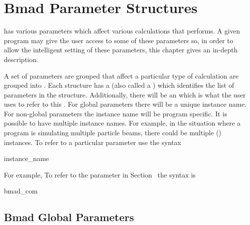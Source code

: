 \chapter{Bmad Parameter Structures}

\bmad has various parameters which affect various
calculations that \bmad performs. A given program may give the user
access to some of these parameters so, in order to allow the intelligent
setting of these parameters, this chapter gives an in-depth description.

A set of parameters are grouped that affect a particular type
of calculation are grouped into . Each structure
has a  (also called a ) which identifies
the list of parameters in the structure. 
Additionally, there will be an
 which is what the user uses to refer to this
. For global parameters there will be a unique instance name.
For non-global parameters the instance name will be program specific. 
It is possible to have multiple instance names. For example, in the situation
where a program is simulating multiple particle beams, there could be
multiple  () instances. 
To refer to a particular parameter use the syntax
\begin{example}
  instance_name%
\end{example}
For example, To refer to the  parameter in
Section~ the syntax is
\begin{example}
  bmad_com%
\end{example}

\section{Bmad Global Parameters}
\label{s:bmad_params}


